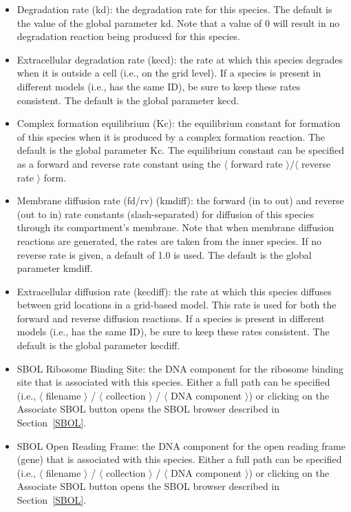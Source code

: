 \documentclass[titlepage,11pt]{article}
\begin{document}
\begin{itemize}
\item Degradation rate (kd): the degradation rate for this species.  The default is the value of the global parameter kd.  Note that a value of 0 will result in no degradation reaction being produced for this species.
\item Extracellular degradation rate (kecd): the rate at which this species degrades when it is outside a cell (i.e., on the grid level).  If a species is present in different models (i.e., has the same ID), be sure to keep these rates consistent.  The default is the global parameter kecd.
\item Complex formation equilibrium (Kc): the equilibrium constant for formation of this species when it is produced by a complex formation reaction.  The default is the global parameter Kc.  The equilibrium constant can be specified as a forward and reverse rate constant using the $\langle$ forward rate $\rangle / \langle$ reverse rate $\rangle$ form.
\item Membrane diffusion rate (fd/rv) (kmdiff): the forward (in to out) and reverse (out to in) rate constants (slash-separated) for diffusion of this species through its compartment's membrane.  Note that when membrane diffusion reactions are generated, the rates are taken from the inner species.  If no reverse rate is given, a default of 1.0 is used.  The default is the global parameter kmdiff.
\item Extracellular diffusion rate (kecdiff): the rate at which this species diffuses between grid locations in a grid-based model.  This rate is used for both the forward and reverse diffusion reactions.  If a species is present in different models (i.e., has the same ID), be sure to keep these rates consistent.  The default is the global parameter kecdiff.
\item SBOL Ribosome Binding Site: the DNA component for the ribosome binding site that is associated with this species.     Either a full path can be specified (i.e., $\langle$ filename $\rangle$ / $\langle$ collection $\rangle$ / $\langle$ DNA component $\rangle$) or clicking on the Associate SBOL button opens the SBOL browser described in Section~\ref{SBOL}.
\item SBOL Open Reading Frame: the DNA component for the open reading frame (gene) that is associated with this species.    Either a full path can be specified (i.e., $\langle$ filename $\rangle$ / $\langle$ collection $\rangle$ / $\langle$ DNA component $\rangle$) or clicking on the Associate SBOL button opens the SBOL browser described in Section~\ref{SBOL}.
\end{itemize}
\end{document}
